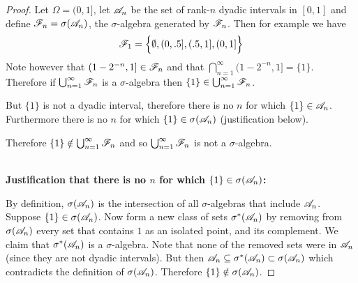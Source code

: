 \begin{enumerate}
\begin{enumerate}[label=(\alph*)]
    \begin{proof}
      Let $\Omega = (0, 1]$, let $\mathscr A_n$ be the set of rank-$n$ dyadic intervals in $[0, 1]$ and
      define $\mathscr F_n = \sigma(\mathscr A_n)$, the $\sigma$-algebra generated by $\mathscr F_n$. Then for example we have
      \begin{align*}
        \mathscr F_1 &= \Big\{\emptyset,
                  (0, .5], (.5, 1],
                  (0, 1]
                  \Big\} \\
      \end{align*}
      Note however that $(1 - 2^{-n}, 1] \in \mathscr F_n$ and that $\bigcap_{n=1}^\infty (1 - 2^{-n}, 1] = \{1\}$.
      Therefore if $\bigcup_{n=1}^\infty \mathscr F_n$ is a $\sigma$-algebra
      then $\{1\} \in \bigcup_{n=1}^\infty \mathscr F_n$.

      But $\{1\}$ is not a dyadic interval, therefore there is no $n$ for which $\{1\} \in \mathscr A_n$.
      Furthermore there is no $n$ for which $\{1\} \in \sigma(\mathscr A_n)$ (justification below).

      Therefore $\{1\} \notin \bigcup_{n=1}^\infty \mathscr F_n$ and so $\bigcup_{n=1}^\infty \mathscr F_n$ is not a $\sigma$-algebra.

      ~\\
      \textbf{Justification that there is no $n$ for which $\{1\} \in \sigma(\mathscr A_n)$:}

      By definition, $\sigma(\mathscr A_n)$ is the intersection of all $\sigma$-algebras that include $\mathscr A_n$.
      Suppose $\{1\} \in \sigma(\mathscr A_n)$. Now form a new class of sets $\sigma^*(\mathscr A_n)$ by removing
      from $\sigma(\mathscr A_n)$ every set that contains $1$ as an isolated point, and its complement. We claim
      that $\sigma^*(\mathscr A_n)$ is a $\sigma$-algebra. Note that none of the removed sets were in $\mathscr A_n$
      (since they are not dyadic intervals). But
      then $\mathscr A_n \subseteq \sigma^*(\mathscr A_n) \subset \sigma(\mathscr A_n)$ which contradicts the definition
      of $\sigma(\mathscr A_n)$. Therefore $\{1\} \notin \sigma(\mathscr A_n)$.
    \end{proof}
  \end{enumerate}


\end{enumerate}

